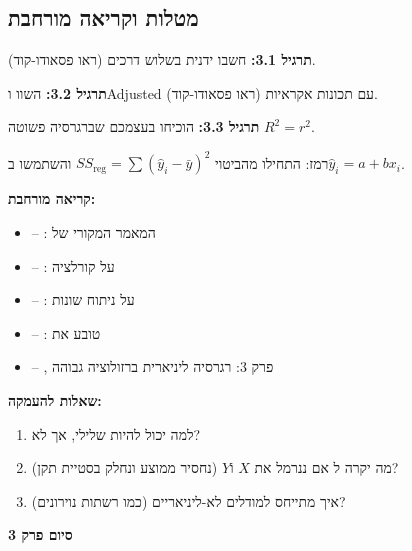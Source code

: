 \subsection*{מטלות וקריאה מורחבת}

\textbf{תרגיל \num{3.1}:} חשבו \Rsquared{} ידנית בשלוש דרכים (ראו פסאודו-קוד).

\textbf{תרגיל \num{3.2}:} השוו \Rsquared{} ו\en{-}Adjusted \Rsquared{} עם תכונות אקראיות (ראו פסאודו-קוד).

\textbf{תרגיל \num{3.3}:} הוכיחו בעצמכם שברגרסיה פשוטה $R^2 = r^2$.

רמז: התחילו מהביטוי $SS_{\text{reg}} = \sum (\hat{y}_i - \bar{y})^2$ והשתמשו ב\en{-}$\hat{y}_i = a + bx_i$.

\textbf{קריאה מורחבת:}

\begin{itemize}
\item \cite{galton1886} – : המאמר המקורי של 
\item \cite{pearson1896} – :  על קורלציה
\item \cite{fisher1925} – :  על ניתוח שונות
\item \cite{wright1921} – :  טובע את \Rsquared{}
\item \cite{hastie2009} – , פרק \num{3}: רגרסיה ליניארית ברזולוציה גבוהה
\end{itemize}

\textbf{שאלות להעמקה:}

\begin{enumerate}
\item למה  יכול להיות שלילי, אך \Rsquared{} לא?
\item מה יקרה ל\en{-}\Rsquared{} אם ננרמל את $X$ ו\en{-}$Y$ (נחסיר ממוצע ונחלק בסטיית תקן)?
\item איך \Rsquared{} מתייחס למודלים לא-ליניאריים (כמו רשתות נוירונים)?
\end{enumerate}

\textbf{סיום פרק \num{3}}